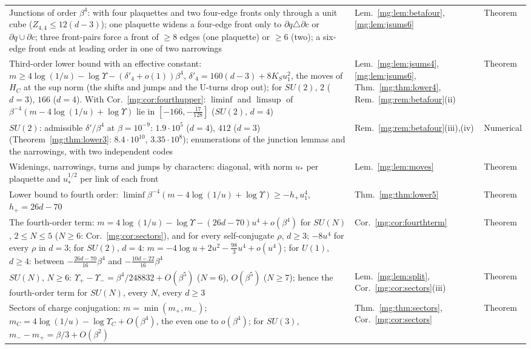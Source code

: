 \documentclass[11pt,a4paper]{article}
\theoremstyle{definition}
\theoremstyle{remark}
\begin{document}
\begin{longtable}{@{}p{}p{}p{}@{}}
Junctions of order $\beta^4$: with four plaquettes and two four-edge fronts only through a unit cube ($Z_{4,4}\le12(d-3)$); one plaquette widens a four-edge front only to $\partial q\triangle\partial c$ or $\partial q\cup\partial c$; three front-pairs force a front of $\ge8$ edges (one plaquette) or $\ge6$ (two); a six-edge front ends at leading order in one of two narrowings & Lem.~\ref{mg:lem:betafour}, \ref{mg:lem:jsums6} & Theorem\\
Third-order lower bound with an effective constant: $m\ge4\log(1/u)-\log\Upsilon-(\delta'_4+o(1))\beta^4$, $\delta'_4=160(d-3)+8K_Su_1^2$, the moves of $H_C$ at the sup norm (the shifts and jumps and the U-turns drop out); for $SU(2)$, $2$ ($d=3$), $166$ ($d=4$). With Cor.~\ref{mg:cor:fourthupper}: $\liminf$ and $\limsup$ of $\beta^{-4}(m-4\log(1/u)+\log\Upsilon)$ lie in $[-166,-\frac{17}{128}]$ ($SU(2)$, $d=4$) & Lem.~\ref{mg:lem:jsums4}, \ref{mg:lem:jsums6}, Thm.~\ref{mg:thm:lower4}, Rem.~\ref{mg:rem:betafour}(ii) & Theorem\\
$SU(2)$: admissible $\delta'/\beta^4$ at $\beta=10^{-9}$: $1.9\cdot10^5$ ($d=4$), $412$ ($d=3$) (Theorem~\ref{mg:thm:lower3}: $8.4\cdot10^{10}$, $3.35\cdot10^8$); enumerations of the junction lemmas and the narrowings, with two independent codes & Rem.~\ref{mg:rem:betafour}(iii),(iv) & Numerical\\
Widenings, narrowings, turns and jumps by characters: diagonal, with norm $u_*$ per plaquette and $u_*^{1/2}$ per link of each front & Lem.~\ref{mg:lem:moves} & Theorem\\
Lower bound to fourth order: $\liminf\beta^{-4}(m-4\log(1/u)+\log\Upsilon)\ge-h_+u_1^4$, $h_+=26d-70$ & Thm.~\ref{mg:thm:lower5} & Theorem\\
The fourth-order term: $m=4\log(1/u)-\log\Upsilon-(26d-70)u^4+o(\beta^4)$ for $SU(N)$, $2\le N\le5$ ($N\ge6$: Cor.~\ref{mg:cor:sectors}), and for every self-conjugate $\rho$, $d\ge3$; $-8u^4$ for every $\rho$ in $d=3$; for $SU(2)$, $d=4$: $m=-4\log u+2u^2-\frac{98}3u^4+o(u^4)$; for $U(1)$, $d\ge4$: between $-\frac{26d-70}{16}\beta^4$ and $-\frac{10d-22}{16}\beta^4$ & Cor.~\ref{mg:cor:fourthterm} & Theorem\\
$SU(N)$, $N\ge6$: $\Upsilon_+-\Upsilon_-=\beta^4/248832+O(\beta^5)$ ($N=6$), $O(\beta^5)$ ($N\ge7$); hence the fourth-order term for $SU(N)$, every $N$, every $d\ge3$ & Lem.~\ref{mg:lem:split}, Cor.~\ref{mg:cor:sectors}(iii) & Theorem\\
Sectors of charge conjugation: $m=\min(m_+,m_-)$; $m_C=4\log(1/u)-\log\Upsilon_C+O(\beta^4)$, the even one to $o(\beta^4)$; for $SU(3)$, $m_--m_+=\beta/3+O(\beta^2)$ & Thm.~\ref{mg:thm:sectors}, Cor.~\ref{mg:cor:sectors} & Theorem\\

\end{longtable}
\end{document}
